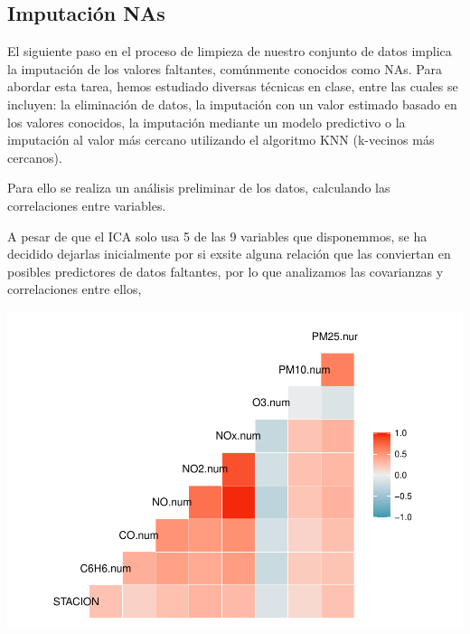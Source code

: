 \documentclass[notspecified,article,submit,moreauthors,pdftex]{Definitions/mdpi}
\begin{document}
\hypertarget{imputaciuxf3n-nas}{%
\subsection{Imputación NAs}\label{imputaciuxf3n-nas}}

El siguiente paso en el proceso de limpieza de nuestro conjunto de datos
implica la imputación de los valores faltantes, comúnmente conocidos
como NAs. Para abordar esta tarea, hemos estudiado diversas técnicas en
clase, entre las cuales se incluyen: la eliminación de datos, la
imputación con un valor estimado basado en los valores conocidos, la
imputación mediante un modelo predictivo o la imputación al valor más
cercano utilizando el algoritmo KNN (k-vecinos más cercanos).

Para ello se realiza un análisis preliminar de los datos, calculando las
correlaciones entre variables.

A pesar de que el ICA solo usa 5 de las 9 variables que disponemmos, se
ha decidido dejarlas inicialmente por si exsite alguna relación que las
conviertan en posibles predictores de datos faltantes, por lo que
analizamos las covarianzas y correlaciones entre ellos,

\includegraphics{ProyectoAED2023_files/figure-latex/unnamed-chunk-12-1.pdf}
\end{document}
